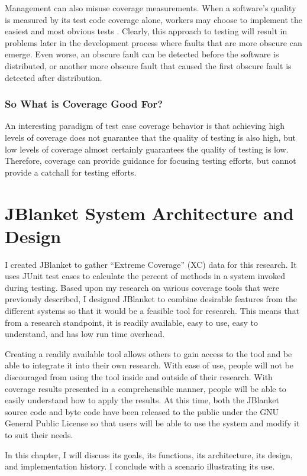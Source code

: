 Management can also misuse coverage measurements.  When a software's
quality is measured by its test code coverage alone, workers may choose to
implement the easiest and most obvious tests \cite{Marick:1997}.  Clearly,
this approach to testing will result in problems later in the development
process where faults that are more obscure can emerge.  Even worse, an
obscure fault can be detected before the software is distributed, or
another more obscure fault that caused the first obscure fault is detected
after distribution.

\subsection{So What is Coverage Good For?}
An interesting paradigm of test case coverage behavior is that achieving
high levels of coverage does not guarantee that the quality of testing is
also high, but low levels of coverage almost certainly guarantees the
quality of testing is low.  Therefore, coverage can provide guidance for
focusing testing efforts, but cannot provide a catchall for testing
efforts.

\chapter{JBlanket System Architecture and Design}
I created JBlanket to gather ``Extreme Coverage'' (XC) data for this
research. It uses JUnit test cases to calculate the percent of methods in a
system invoked during testing. Based upon my research on various coverage
tools that were previously described, I designed JBlanket to combine
desirable features from the different systems so that it would be a
feasible tool for research. This means that from a research standpoint, it
is readily available, easy to use, easy to understand, and has low run time
overhead.

Creating a readily available tool allows others to gain access to the tool
and be able to integrate it into their own research. With ease of use,
people will not be discouraged from using the tool inside and outside of
their research. With coverage results presented in a comprehensible manner,
people will be able to easily understand how to apply the results.  At this
time, both the JBlanket source code and byte code have been released to the
public under the GNU General Public License \cite{license:GNU} so that
users will be able to use the system and modify it to suit their needs.

In this chapter, I will discuss its goals, its functions, its architecture,
its design, and implementation history.  I conclude with a scenario
illustrating its use.


